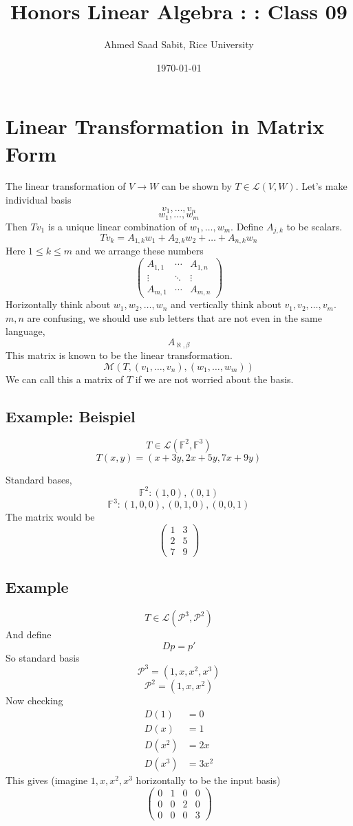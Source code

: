\documentclass[letter]{article}
\title{Honors Linear Algebra : : Class 09}
\author{Ahmed Saad Sabit, Rice University}
\date{\today}
\begin{document}
\maketitle\section*{Linear Transformation in Matrix Form}
The linear transformation of $V \to W$ can be shown by $T \in \mathcal L (V,W)$. Let's make individual basis 
\[
v_1, \ldots, v_n
\] 
\[
w_1, \ldots, w_m
\]
Then $T v_1$ is a unique linear combination of $w_1, \ldots, w_m$. Define $A_{j,k}$ to be scalars. 
\[
	T v_k = A_{1,k} w_1 + A_{2,k} w_2 + \ldots + A_{n,k} w_n
\] 
Here $1\le k\le m$ and we arrange these numbers 
\[
	\begin{pmatrix} A_{1,1} & \cdots & A_{1,n} \\ 
	\vdots & \ddots & \vdots \\ 
A_{m,1} & \cdots & A_{m,n}\end{pmatrix} 
\]
Horizontally think about $w_1, w_2, \ldots, w_n$ and vertically think about $v_1, v_2, \ldots, v_m$.
$m,n$ are confusing, we should use sub letters that are not even in the same language, 
\[
	A_{\aleph, \beta}
\]
This matrix is known to be the linear transformation. 
\[
\mathcal M (
T, (v_1, \ldots, v_n)
,
(w_1, \ldots, w_m)
)
\] 
We can call this a matrix of $T$ if we are not worried about the basis. 

\subsection*{Example: Beispiel}
\[
T \in \mathcal L (\mathbb{F}^{2}, \mathbb{F}^{3})
\] 
\[
T (x,y) = 
(x+3y, 
2x+5y, 
7x + 9y)
\] 

Standard bases,
\[
\mathbb{F}^{2} : (1,0), (0,1)
\] 
\[
\mathbb{F}^3 : (1,0,0),(0,1,0), (0,0,1)
\] 
The matrix would be
\[
	\begin{pmatrix} 1  &3 \\ 2 & 5 \\ 7 & 9 \end{pmatrix} 
\]
\subsection*{Example} 
\[
T \in  \mathcal L (\mathcal P ^3, \mathcal P^2)
\]
And define
\[
Dp = p'
\] 
So standard basis 
\[
\mathcal P ^3 = (1,x,x^2,x^3)
\]
\[
\mathcal P ^2 = (1,x,x^2)
\]
Now checking
\begin{align*}
	D(1) &= 0 \\
	D(x) &= 1 \\
	D(x^2) &= 2x \\ 
	D(x^3) &= 3x^2 
\end{align*}
This gives (imagine $1,x,x^2,x^3$ horizontally to be the input basis)
\[ 	\begin{pmatrix} 0 & 1 & 0 & 0 \\ 
	0 & 0 & 2 & 0 \\ 
	0 & 0 & 0 & 3
\end{pmatrix}
\]
\end{document}
